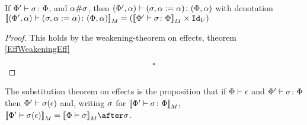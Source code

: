 \documentclass{Report}
\begin{document}
\begin{lemma}
     If $\Phi' \vdash \sigma \colon \Phi$, and $\alpha\#\sigma$, then $(\Phi', \alpha) \vdash (\sigma, \alpha:=\alpha) \colon (\Phi,\alpha)$ with denotation ${\bf [\![}(\Phi', \alpha) \vdash (\sigma, \alpha:=\alpha) \colon (\Phi,\alpha){\bf ]\!]}_M = ({\bf [\![}\Phi' \vdash \sigma \colon \Phi{\bf ]\!]}_M\times\texttt{Id}_{U})$
\end{lemma}
\begin{proof}
    This holds by the weakening-theorem on effects, theorem \ref{EffWeakeningEff}

    $$\square$$
\end{proof}



\begin{theorem}
    The substitution theorem on effects is the proposition that if $\Phi\vdash \epsilon$ and $\Phi' \vdash \sigma \colon \Phi$ then $\Phi'\vdash \sigma(\epsilon)$ and, writing $\sigma$ for ${\bf [\![}\Phi' \vdash \sigma \colon \Phi{\bf ]\!]}_M$,  $\deno{\wellformed{\P'}{\si(\e)}} = \deno{\wellformed{\P}{\si}}\after\si$. 
\end{theorem}
\end{document}
